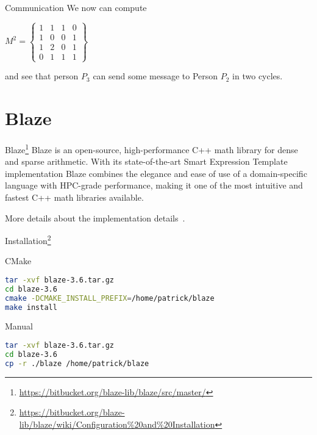 \documentclass[12pt,t]{beamer}
\begin{document}
\begin{frame}{Communication}
We now can compute 

\begin{center}
$
M^2 = \left\lbrace\begin{matrix}
1 &  1 & 1 &  0 \\
1 & 0 & 0  & 1 \\
1 & 2 & 0 & 1 \\
0 & 1 & 1 & 1
\end{matrix} \right\rbrace
$
\end{center}
and see that person $P_3$ can send some message to Person $P_2$ in two cycles. 


\end{frame}


\section{Blaze}

\begin{frame}{Blaze\footnote{\tiny\url{https://bitbucket.org/blaze-lib/blaze/src/master/}}}
Blaze is an open-source, high-performance C++ math library for dense and sparse arithmetic. With its state-of-the-art Smart Expression Template implementation Blaze combines the elegance and ease of use of a domain-specific language with HPC-grade performance, making it one of the most intuitive and fastest C++ math libraries available.
\vspace{1cm}

More details about the implementation details~\cite{doi:10.1137/110830125,6266939}.
\end{frame}



\begin{frame}[fragile]{Installation\footnote{\tiny\url{https://bitbucket.org/blaze-lib/blaze/wiki/Configuration\%20and\%20Installation}}}


\begin{block}{CMake}
\begin{lstlisting}[language=bash]
tar -xvf blaze-3.6.tar.gz
cd blaze-3.6
cmake -DCMAKE_INSTALL_PREFIX=/home/patrick/blaze
make install
\end{lstlisting}
\end{block}

\begin{block}{Manual}
\begin{lstlisting}[language=bash]
tar -xvf blaze-3.6.tar.gz
cd blaze-3.6
cp -r ./blaze /home/patrick/blaze
\end{lstlisting}
\end{block}


\end{frame}
\end{document}
